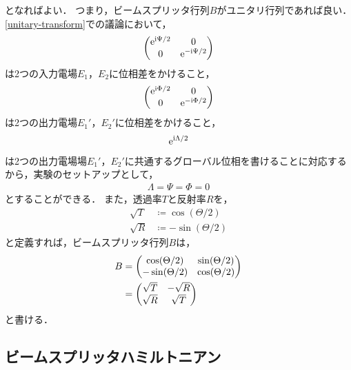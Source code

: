 \documentclass{report}
\begin{document}
    となればよい．
    つまり，ビームスプリッタ行列$B$がユニタリ行列であれば良い．
    \ref{unitary-transform}での議論において，
    \begin{align}
      \mqty(\e^{\i\Psi/2} & 0 \\ 0 & \e^{-\i\Psi/2})
    \end{align}
    は2つの入力電場$E_1$，$E_2$に位相差をかけること，
    \begin{align}
      \mqty(\e^{\i\Phi/2} & 0 \\ 0 & \e^{-\i\Phi/2})
    \end{align}
    は2つの出力電場$E_1'$，$E_2'$に位相差をかけること，
    \begin{align}
      \mathrm{e}^{\mathrm{i}\Lambda/2}
    \end{align}
    は2つの出力電場場$E_1'$，$E_2'$に共通するグローバル位相を書けることに対応するから，実験のセットアップとして，
    \begin{align}
      \Lambda = \Psi = \Phi = 0
    \end{align}
    とすることができる．
    また，透過率$T$と反射率$R$を，
    \begin{align}
      \sqrt{T} &\coloneqq \cos(\Theta/2) \\ 
      \sqrt{R} &\coloneqq -\sin(\Theta/2)
    \end{align}
    と定義すれば，ビームスプリッタ行列$B$は，
    \begin{align}
      B &= \mqty(
        \cos(\Theta/2) & \sin(\Theta/2) \\ 
        -\sin(\Theta/2) & \cos(\Theta/2)
      ) \\ 
      &= \mqty(\sqrt{T} & -\sqrt{R} \\ \sqrt{R} & \sqrt{T})
    \end{align}
    と書ける．
  \subsection{ビームスプリッタハミルトニアン}
\end{document}
